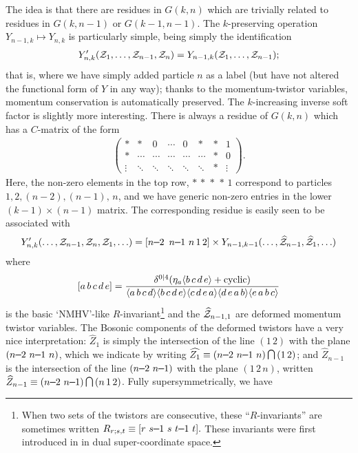 \documentclass[11pt, reqno]{article}
\newcommand{\be}{\begin{eqnarray}}
\newcommand{\ee}{\end{eqnarray}}
\newcommand{\smallminus}{{\rm\rule[2.4pt]{6pt}{0.65pt}}}
\renewcommand{\cap}{\mathrm{\raisebox{0.75pt}{{$\,\bigcap\,$}}}}
\newcommand{\ab}[1]{\langle #1\rangle}
\begin{document}
The idea is that there are
residues in \mbox{$G(k,n)$} which are trivially related to residues in
\mbox{$G(k,n-1)$} or \mbox{$G(k-1,n-1)$}. The $k$-preserving operation \mbox{$Y_{n-1,k}\mapsto Y_{n,k}$} is particularly simple, being simply the identification \be
Y^\prime_{n,k}({\cal Z}_1, \ldots, {\cal Z}_{n-1},{\cal Z}_n)=Y_{n-1,k}({\cal Z}_1, \ldots, {\cal Z}_{n-1}); \ee that is, where we have
simply added particle $n$ as a label (but have not altered the functional form of $Y$ in any way); thanks to the momentum-twistor variables,
momentum conservation is automatically preserved.  The $k$-increasing inverse
soft factor is slightly more interesting. There is always a residue
of \mbox{$G(k,n)$} which has a $C$-matrix of the form
\be\left(\begin{array}{cccccccc}*&*&0&\cdots&0&*&*&1\\ * &\cdots&\cdots&\cdots&\cdots&\cdots&*&0\\\vdots&\ddots&\ddots&\ddots&\ddots&\ddots&*&\vdots\end{array}\right).\ee
Here, the non-zero elements in the top
row, $* \,*\,*\,*  \, 1$ correspond to particles
\mbox{$1,2,(n-2),(n-1),\,n$}, and we have generic non-zero entries in the
lower $(k-1) \times (n-1)$ matrix. The corresponding residue is easily seen to be associated with
\be Y^\prime_{n,k}(\ldots, {\cal Z}_{n-1}, {\cal Z}_n, {\cal Z}_1, \ldots)=[n\smallminus2\,\,\, n\smallminus1\,\, n \, 1 \, 2] \times Y_{n-1,k-1}(\ldots, \widehat{{\cal
Z}}_{n-1}, \widehat{{\cal Z}}_1, \ldots)\ee where \be\label{Rinv} [a \, b \,
c \, d \, e] = \frac{\delta^{0|4}(\eta_{a} \langle b \, c \,
d \, e \rangle + {\rm cyclic})}{\langle a \, b \, c \, d
\rangle \langle b \, c \, d \, e \rangle \ab{c\,d\,e\,a}\ab{d\,e\,a\,b} \langle e
\, a \, b \, c \rangle} \ee is the basic `NMHV'-like $R$-invariant\footnote{When two sets of the twistors are consecutive, these ``$R$-invariants'' are sometimes written \mbox{$R_{r;s,t}\equiv[r\,\,s\smallminus1\,\,s\,\,t\smallminus1\,\,t].$} These invariants were first introduced in \cite{Drummond:2008vq} in dual super-coordinate space.}
and the $\widehat{{\cal Z}}_{n-1,1}$ are deformed momentum twistor
variables. The Bosonic components of the deformed twistors have a very nice interpretation: $\widehat{Z}_1$ is simply the intersection of the line $(1\,2)$ with the plane $(n\smallminus2 \,\, n\smallminus1\,\, n)$, which we indicate by writing \mbox{$\widehat{Z_1}\equiv(n\smallminus2\,\,n\smallminus1\,\,n)\cap(1\,2)$}; and $\widehat{Z}_{n-1}$ is the intersection of the line $(n\smallminus2\,\,n\smallminus1)$ with the plane $(1 \, 2\,n)$, written \mbox{$\widehat{Z}_{n-1}\equiv(n\smallminus2\,\,n\smallminus1)\cap(n \, 1 \, 2)$}. Fully supersymmetrically, we have
\end{document}
